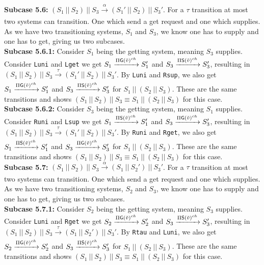 \indent \textbf{Subcase 5.6: }$(S_1 \ || \ S_2)\ ||\ S_3 \xrightarrow[]{\alpha} (S_1' \ || \ S_2)\ ||\ S_3'$. For a $\tau$ transition at most two systems can transition. One which send a get request and one which supplies. As we have two transitioning systems, $S_1$ and $S_3$, we know one has to supply and one has to get, giving us two subcases.\\
\indent \indent \textbf{Subcase 5.6.1: } Consider $S_1$ being the getting system, meaning $S_3$ supplies. Consider \texttt{Luni} and \texttt{Lget} we get $S_1\xrightarrow[]{\Pi \mathsf{G}(\Tilde{v})^{ch}} S_1'$ and $S_3\xrightarrow[]{\Pi \mathsf{S}(\Tilde{v})^{ch}} S_3'$, resulting in $(S_1 \ || \ S_2)\ ||\ S_3 \xrightarrow[]{\tau} (S_1' \ || \ S_2)\ ||\ S_3'$. By \texttt{Luni} and \texttt{Rsup}, we also get $S_1\xrightarrow[]{\Pi \mathsf{G}(\Tilde{v})^{ch}} S_1'$ and $S_3\xrightarrow[]{\Pi \mathsf{S}(\Tilde{v})^{ch}} S_3'$ for $S_1 \ ||\ (S_2 \ || \ S_3)$. These are the same transitions and shows $(S_1 \ ||\ S_2 )\ || \ S_3 \equiv S_1 \ ||\ (S_2 \ || \ S_3)$ for this case.\\
\indent \indent \textbf{Subcase 5.6.2: } Consider $S_3$ being the getting system, meaning $S_1$ supplies. Consider \texttt{Runi} and \texttt{Lsup} we get $S_1\xrightarrow[]{\Pi \mathsf{S}(\Tilde{v})^{ch}} S_1'$ and $S_3\xrightarrow[]{\Pi \mathsf{G}(\Tilde{v})^{ch}} S_3'$, resulting in $(S_1 \ || \ S_2)\ ||\ S_3 \xrightarrow[]{\tau} (S_1' \ || \ S_2)\ ||\ S_3'$. By \texttt{Runi} and \texttt{Rget}, we also get $S_1\xrightarrow[]{\Pi \mathsf{S}(\Tilde{v})^{ch}} S_1'$ and $S_3\xrightarrow[]{\Pi \mathsf{G}(\Tilde{v})^{ch}} S_3'$ for $S_1 \ ||\ (S_2 \ || \ S_3)$. These are the same transitions and shows $(S_1 \ ||\ S_2 )\ || \ S_3 \equiv S_1 \ ||\ (S_2 \ || \ S_3)$ for this case.\\
\indent \textbf{Subcase 5.7: }$(S_1 \ || \ S_2)\ ||\ S_3 \xrightarrow[]{\alpha} (S_1 \ || \ S_2')\ ||\ S_3'$. For a $\tau$ transition at most two systems can transition. One which send a get request and one which supplies. As we have two transitioning systems, $S_2$ and $S_3$, we know one has to supply and one has to get, giving us two subcases.\\
\indent \indent \textbf{Subcase 5.7.1: } Consider $S_2$ being the getting system, meaning $S_3$ supplies. Consider \texttt{Luni} and \texttt{Rget} we get $S_2\xrightarrow[]{\Pi \mathsf{G}(\Tilde{v})^{ch}} S_2'$ and $S_3\xrightarrow[]{\Pi \mathsf{S}(\Tilde{v})^{ch}} S_3'$, resulting in $(S_1 \ || \ S_2)\ ||\ S_3 \xrightarrow[]{\tau} (S_1 \ || \ S_2')\ ||\ S_3'$. By \texttt{Rtau} and \texttt{Luni}, we also get $S_2\xrightarrow[]{\Pi \mathsf{G}(\Tilde{v})^{ch}} S_2'$ and $S_3\xrightarrow[]{\Pi \mathsf{S}(\Tilde{v})^{ch}} S_3'$ for $S_1 \ ||\ (S_2 \ || \ S_3)$. These are the same transitions and shows $(S_1 \ ||\ S_2 )\ || \ S_3 \equiv S_1 \ ||\ (S_2 \ || \ S_3)$ for this case.\\
